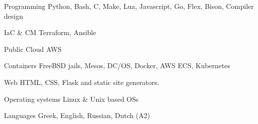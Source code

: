 


\begin{cvskills}


\cvskill
{Programming} %
{Python, Bash, C, Make, Lua, Javascript, Go, Flex, Bison, Compiler design} %


\cvskill
		{IaC \& CM} %
{Terraform, Ansible} %


\cvskill
{Public Cloud} %
{AWS} %


\cvskill
{Containers} %
{FreeBSD jails, Mesos, DC/OS, Docker, AWS ECS, Kubernetes} %


\cvskill
{Web} %
{HTML, CSS, Flask and static site generators.} %


\cvskill
{Operating systems} %
{Linux \& Unix based OSs} %




\cvskill
{Languages} %
{Greek, English, Russian, Dutch (A2)} %

\end{cvskills}
